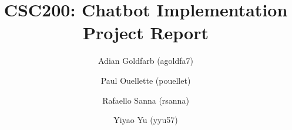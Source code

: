 \title{CSC200: Chatbot Implementation Project Report}

\author{Adian Goldfarb (agoldfa7)}

\author{Paul Ouellette (pouellet)}

\author{Rafaello Sanna (rsanna)}

\author{Yiyao Yu (yyu57)}
